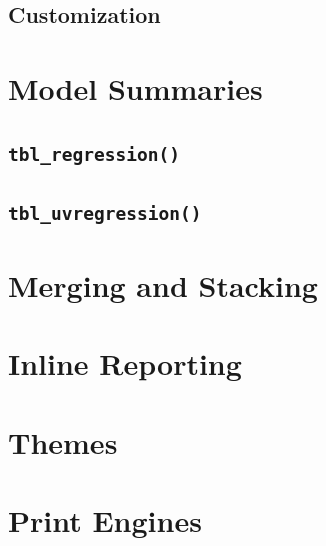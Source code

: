 \documentclass[
]{article}
\begin{document}
\hypertarget{customization}{%
\subsection{Customization}\label{customization}}

\hypertarget{model-summaries}{%
\section{Model Summaries}\label{model-summaries}}

\hypertarget{tbl_regression}{%
\subsection{\texorpdfstring{\texttt{tbl\_regression()}}{tbl\_regression()}}\label{tbl_regression}}

\hypertarget{tbl_uvregression}{%
\subsection{\texorpdfstring{\texttt{tbl\_uvregression()}}{tbl\_uvregression()}}\label{tbl_uvregression}}

\hypertarget{merging-and-stacking}{%
\section{Merging and Stacking}\label{merging-and-stacking}}

\hypertarget{inline-reporting}{%
\section{Inline Reporting}\label{inline-reporting}}

\hypertarget{themes}{%
\section{Themes}\label{themes}}

\hypertarget{print-engines}{%
\section{Print Engines}\label{print-engines}}
\end{document}
